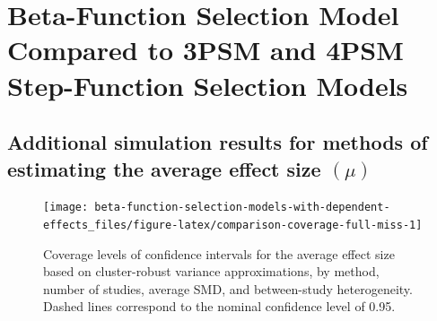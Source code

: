 \documentclass[
  american,
  man, donotrepeattitle,floatsintext]{apa7}
\begin{document}
\section{Beta-Function Selection Model Compared to 3PSM and 4PSM Step-Function Selection Models}\label{beta-function-selection-model-compared-to-3psm-and-4psm-step-function-selection-models}

\subsection{\texorpdfstring{Additional simulation results for methods of estimating the average effect size \((\mu)\)}{Additional simulation results for methods of estimating the average effect size (\textbackslash mu)}}\label{mu-simulation-results-miss}

\begin{figure}
\texttt{[image: beta-function-selection-models-with-dependent-effects\_files/figure-latex/comparison-coverage-full-miss-1]} \caption{Coverage levels of confidence intervals for the average effect size based on cluster-robust variance approximations, by method, number of studies, average SMD, and between-study heterogeneity. Dashed lines correspond to the nominal confidence level of 0.95.}\label{fig:comparison-coverage-full-miss}
\end{figure}
\end{document}
